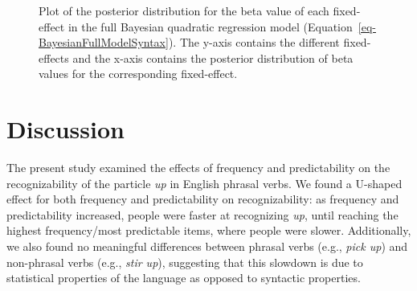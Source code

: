 \documentclass[
  12pt,
  letterpaper,
]{scrreport}
\begin{document}
\begin{figure}[htbp]

\caption{\label{fig-posteriorplotFullQuadratic}Plot of the posterior
distribution for the beta value of each fixed-effect in the full
Bayesian quadratic regression model
(Equation~\ref{eq-BayesianFullModelSyntax}). The y-axis contains the
different fixed-effects and the x-axis contains the posterior
distribution of beta values for the corresponding fixed-effect.}


\end{figure}%

\section{Discussion}\label{discussion-4}

The present study examined the effects of frequency and predictability
on the recognizability of the particle \emph{up} in English phrasal
verbs. We found a U-shaped effect for both frequency and predictability
on recognizability: as frequency and predictability increased, people
were faster at recognizing \emph{up}, until reaching the highest
frequency/most predictable items, where people were slower.
Additionally, we also found no meaningful differences between phrasal
verbs (e.g., \emph{pick up}) and non-phrasal verbs (e.g., \emph{stir
up}), suggesting that this slowdown is due to statistical properties of
the language as opposed to syntactic properties.
\end{document}
